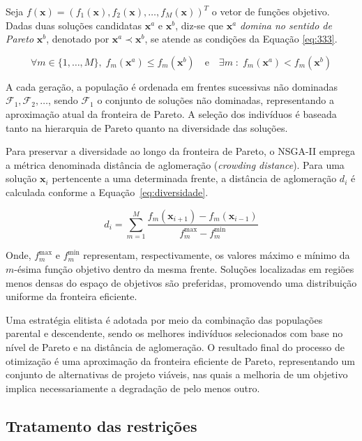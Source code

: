 Seja $f(\mathbf{x}) = \left(f_1(\mathbf{x}), f_2(\mathbf{x}), \ldots, f_M(\mathbf{x})\right)^T$ o vetor de funções objetivo. Dadas duas soluções candidatas $\mathbf{x}^a$ e $\mathbf{x}^b$, diz-se que $\mathbf{x}^a$ \textit{domina no sentido de Pareto} $\mathbf{x}^b$, denotado por $\mathbf{x}^a \prec \mathbf{x}^b$, se atende as condições da Equação \eqref{eq:333}.

\begin{equation}
\forall m \in \{1,\ldots,M\}, \; f_m(\mathbf{x}^a) \leq f_m(\mathbf{x}^b)
\quad \text{e} \quad
\exists m \; : \; f_m(\mathbf{x}^a) < f_m(\mathbf{x}^b)
\label{eq:333}
\end{equation}

A cada geração, a população é ordenada em frentes sucessivas não dominadas $\mathcal{F}_1, \mathcal{F}_2, \ldots$, sendo $\mathcal{F}_1$ o conjunto de soluções não dominadas, representando a aproximação atual da fronteira de Pareto. A seleção dos indivíduos é baseada tanto na hierarquia de Pareto quanto na diversidade das soluções.

Para preservar a diversidade ao longo da fronteira de Pareto, o NSGA-II emprega a métrica denominada distância de aglomeração (\textit{crowding distance}). Para uma solução $\mathbf{x}_i$ pertencente a uma determinada frente, a distância de aglomeração $d_i$ é calculada conforme a Equação~\eqref{eq:diversidade}.

\begin{equation}
d_i = \sum_{m=1}^{M}
\frac{f_m(\mathbf{x}_{i+1}) - f_m(\mathbf{x}_{i-1})}
{f_m^{\max} - f_m^{\min}}
\label{eq:diversidade}
\end{equation}

Onde, $f_m^{\max}$ e $f_m^{\min}$ representam, respectivamente, os valores máximo e mínimo da $m$-ésima função objetivo dentro da mesma frente. Soluções localizadas em regiões menos densas do espaço de objetivos são preferidas, promovendo uma distribuição uniforme da fronteira eficiente.

Uma estratégia elitista é adotada por meio da combinação das populações parental e descendente, sendo os melhores indivíduos selecionados com base no nível de Pareto e na distância de aglomeração. O resultado final do processo de otimização é uma aproximação da fronteira eficiente de Pareto, representando um conjunto de alternativas de projeto viáveis, nas quais a melhoria de um objetivo implica necessariamente a degradação de pelo menos outro.

\subsection{Tratamento das restrições}


